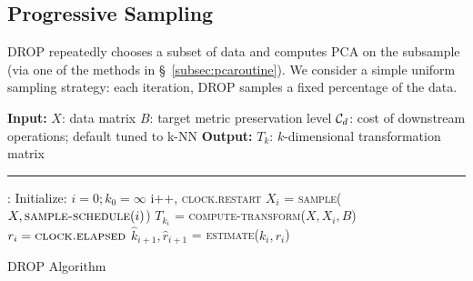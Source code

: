 \subsection{Progressive Sampling}
\label{subsec:psample}
DROP repeatedly chooses a subset of data and computes PCA on the subsample (via one of the methods in \S~\ref{subsec:pcaroutine}).
We consider a simple uniform sampling strategy: each iteration, DROP samples a fixed percentage of the data.


\begin{algorithm}[t!]
\begin{algorithmic}[1]
\small
\Statex \textbf{Input:}  
\Statex $X$: data matrix
\Statex $B$: target metric preservation level
\Statex $\mathcal{C}_{\color{black}d}$: cost of downstream operations; default tuned to k-NN
\Statex
\Statex \textbf{Output:}   
\Statex $T_k$: $k$-dimensional transformation matrix
\Statex
\Statex \hrule
{}:
	\State Initialize: $i = 0; k_0 = \infty$ 
	\Do
		\State i$\texttt{++}$, \textsc{clock.restart}
		\State $X_i$ = \textsc{sample}($X, \textsc{sample-schedule}(i)$) \label{eq:sample}
			\Comment{\S~\ref{subsec:psample}}
		\State $T_{k_i}$ = \textsc{compute-transform}($X, X_i,  B$) \label{eq:evaluate}
			\Comment{\S~\ref{subsec:teval}}
		\State $r_i = \textsc{clock.elapsed}$	
		\State $\hat{k}_{i+1}, \hat{r}_{i+1} $ = \textsc{estimate}($k_i, r_i$) \label{eq:estimate}
			\Comment{\S~\ref{subsec:pest}}
	 \label{eq:optimize}
		\Comment{\S~\ref{subsec:opt}}
	\\
\EndFunction
\end{algorithmic}
\caption{DROP Algorithm}
\label{alg:DROP}
\end{algorithm}



